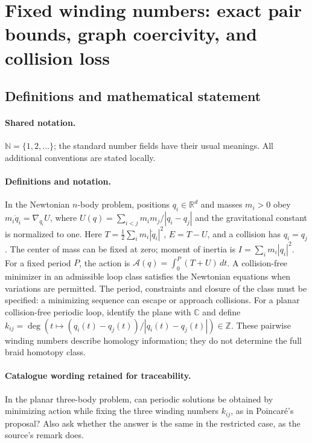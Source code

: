 \documentclass[11pt]{article}
\begin{document}
\section{Fixed winding numbers: exact pair bounds, graph coercivity, and collision loss}\label{statement}

\subsection{Definitions and mathematical statement}

\paragraph{Shared notation.}$\mathbb N=\{1,2,\ldots\}$; the standard number fields have their usual meanings. All additional conventions are stated locally.


\paragraph{Definitions and notation.}In the Newtonian $n$-body problem, positions $q_i\in\mathbb R^d$ and masses $m_i>0$ obey $m_i\ddot q_i=\nabla_{q_i}U$, where $U(q)=\sum_{i<j}m_im_j/|q_i-q_j|$ and the gravitational constant is normalized to one. Here $T=\tfrac12\sum_i m_i|\dot q_i|^2$, $E=T-U$, and a collision has $q_i=q_j$. The center of mass can be fixed at zero; moment of inertia is $I=\sum_i m_i|q_i|^2$. For a fixed period $P$, the action is $\mathcal A(q)=\int_0^P(T+U)\,dt$. A collision-free minimizer in an admissible loop class satisfies the Newtonian equations when variations are permitted. The period, constraints and closure of the class must be specified: a minimizing sequence can escape or approach collisions. For a planar collision-free periodic loop, identify the plane with $\mathbb C$ and define $k_{ij}=\deg(t\mapsto(q_i(t)-q_j(t))/|q_i(t)-q_j(t)|)\in\mathbb Z$. These pairwise winding numbers describe homology information; they do not determine the full braid homotopy class. 

\paragraph{Catalogue wording retained for traceability.}
In the planar three-body problem, can periodic solutions be obtained by minimizing action while fixing the three winding numbers $k_{ij}$, as in Poincaré's proposal? Also ask whether the answer is the same in the restricted case, as the source’s remark does.
\end{document}
